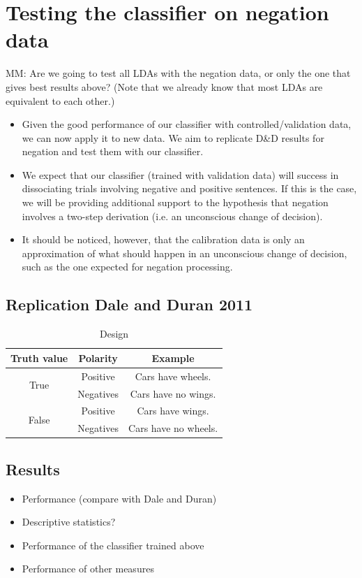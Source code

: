 \documentclass{article}
\newcommand{\addMM}[1]{{\leavevmode\color{red}#1}}
\begin{document}
\section{Testing the classifier on negation data}
\addMM{MM: Are we going to test all LDAs with the negation data, or only the one that gives best results above? (Note that we already know that most LDAs are equivalent to each other.)}
\begin{itemize}

\item Given the good performance of our classifier with controlled/validation data, we can now 
apply it to new data. We aim to replicate D\&D results for negation and test them with our classifier.

\item We expect that our classifier (trained with validation data) will success in dissociating trials involving negative and positive sentences. If this is the case, we will be providing additional support to the hypothesis that negation involves a two-step derivation (i.e. an unconscious change of decision). 

\item It should be noticed, however, that the calibration data is only an approximation of what should happen in an unconscious change of decision, such as the one expected for negation processing.


\end{itemize}

 


\subsection{Replication Dale and Duran 2011}

\begin{table}[h]
\centering
\begin{tabular}{ccc}
Truth value & Polarity & Example \\
\hline
\multirow{2}{*}{True} & Positive & Cars have wheels.\\ 
 & Negatives & Cars have no wings.\\ 
\hline
\multirow{2}{*}{False} & Positive & Cars have wings.\\ 
 & Negatives & Cars have no wheels.\\
\end{tabular}
\caption{Design}
\end{table}

\subsection{Results}

\begin{itemize}
\item Performance (compare with Dale and Duran)
\item Descriptive statistics?
\item Performance of the classifier trained above
\item Performance of other measures
\end{itemize}
\end{document}
